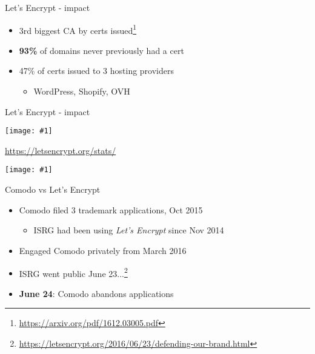 \documentclass[ignorenonframetext,aspectratio=169]{beamer}
\makeatletter
\def\maxwidth{\ifdim\Gin@nat@width>\linewidth\linewidth\else\Gin@nat@width\fi}
\def\maxheight{\ifdim\Gin@nat@height>\textheight0.8\textheight\else\Gin@nat@height\fi}
\newcommand{\includegraphicsscaled}[1]{
    \texttt{[image: \#1]}
}
\makeatother
\begin{document}
\begin{frame}{Let's Encrypt - impact}

\begin{itemize}

\item 3rd biggest CA by certs
    issued\footnote{\url{https://arxiv.org/pdf/1612.03005.pdf}}

\item {\bf 93\%} of domains never previously had a cert

\item 47\% of certs issued to 3 hosting providers
  \begin{itemize}
  \item WordPress, Shopify, OVH
  \end{itemize}

\end{itemize}

\end{frame}

\begin{frame}{Let's Encrypt - impact}

\begin{center}
\includegraphicsscaled{https-pageloads.png}
\end{center}

\tiny

\url{https://letsencrypt.org/stats/}

\end{frame}

\begin{frame}[plain]

\begin{center}
\includegraphicsscaled{comodo-lets-encrypt.png}
\end{center}

\end{frame}

\begin{frame}{Comodo vs Let's Encrypt}

\begin{itemize}

\item<+-> Comodo filed 3 trademark applications, Oct 2015

  \begin{itemize}
  \item  ISRG had been using {\em Let's Encrypt} since Nov 2014
  \end{itemize}

\item  Engaged Comodo privately from March 2016

\item  ISRG went public
  June 23...\footnote{\url{https://letsencrypt.org/2016/06/23/defending-our-brand.html}}

\item<+-> {\bf June 24}: Comodo abandons applications

\end{itemize}

\end{frame}
\end{document}
